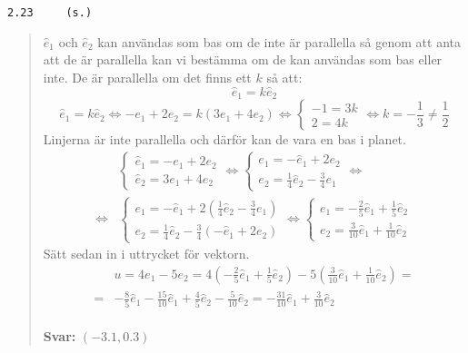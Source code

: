 \documentclass[a4paper]{article}
\newcommand{\tskcol}[1]{\textcolor{tskcol}{#1}}
\begin{document}
\texttt{\tskcol{2.23~~~~ (s.)}}
\begin{quotation}
	\noindent
	$\hat{e}_1$ och $\hat{e}_2$ kan användas som bas om de inte är parallella så genom att anta att de är parallella kan vi bestämma om de kan användas som bas eller inte. De är parallella om det finns ett $k$ så att:
	\[\hat{e}_1=k\hat{e}_2\] 
	\[\hat{e}_1=k\hat{e}_2 \Leftrightarrow
	-e_1+2e_2=k(3e_1+4e_2) \Leftrightarrow
	\begin{cases}
	-1=3k \\
	2=4k
	\end{cases} \Leftrightarrow
	k=-\frac{1}{3}\neq\frac{1}{2}\]
	Linjerna är inte parallella och därför kan de vara en bas i planet.
	\begin{align*}
	&\begin{cases}
	\hat{e}_1=-e_1+2e_2 \\
	\hat{e}_2=3e_1+4e_2
	\end{cases} \Leftrightarrow
	\begin{cases}
	e_1=-\hat{e}_1+2e_2 \\
	e_2=\frac{1}{4}\hat{e}_2-\frac{3}{4}e_1
	\end{cases}\Leftrightarrow \\ \Leftrightarrow
	&\begin{cases}
	e_1=-\hat{e}_1+2(\frac{1}{4}\hat{e}_2-\frac{3}{4}e_1) \\
	e_2=\frac{1}{4}\hat{e}_2-\frac{3}{4}(-\hat{e}_1+2e_2)
	\end{cases}\Leftrightarrow
	\begin{cases}
	e_1=-\frac{2}{5}\hat{e}_1+\frac{1}{5}\hat{e}_2 \\
	e_2=\frac{3}{10}\hat{e}_1+\frac{1}{10}\hat{e}_2
	\end{cases}
	\end{align*}
	Sätt sedan in i uttrycket för vektorn.
	\begin{align*}
	&u=4e_1-5e_2=
	4(-\frac{2}{5}\hat{e}_1+\frac{1}{5}\hat{e}_2)-5(\frac{3}{10}\hat{e}_1+\frac{1}{10}\hat{e}_2)= \\ =
	&-\frac{8}{5}\hat{e}_1-\frac{15}{10}\hat{e}_1+\frac{4}{5}\hat{e}_2-\frac{5}{10}\hat{e}_2=
	-\frac{31}{10}\hat{e}_1+\frac{3}{10}\hat{e}_2
	\end{align*}
	\\
	\textbf{Svar:} $(-3.1,0.3)$
\end{quotation}
\end{document}
